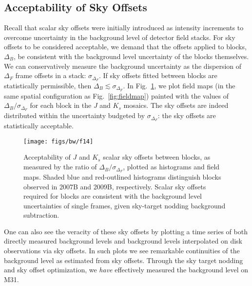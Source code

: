 \documentclass[iop,tighten]{emulateapj}
\newcommand{\Fig}[1]{Fig.~\ref{fig:#1}}  %
\begin{document}
\subsection{Acceptability of Sky Offsets}
\label{sec:offset_acceptability}

Recall that scalar sky offsets were initially introduced as intensity increments to overcome uncertainty in the background level of detector field stacks.
For sky offsets to be considered acceptable, we demand that the offsets applied to blocks, $\Delta_B$, be consistent with the background level uncertainty of the blocks themselves.
We can conservatively measure the background uncertainty as the dispersion of $\Delta_F$ frame offsets in a stack: $\sigma_{\Delta_F}$.
If sky offsets fitted between blocks are statistically permissible, then $\Delta_B \lesssim \sigma_{\Delta_F}$.
In \Fig{offset_ratio_map}, we plot field maps (in the same spatial configuration as \Fig{fieldmap}) painted with the values of $\Delta_B / \sigma_{\Delta_F}$ for each block in the $J$ and $K_s$ mosaics.
The sky offsets are indeed distributed within the uncertainty budgeted by $\sigma_{\Delta_F}$: the sky offsets are statistically acceptable.

\begin{figure}[t]
\centering
\texttt{[image: figs/bw/f14]}
\caption{Acceptability of $J$ and $K_s$ scalar sky offsets between blocks, as measured by the ratio of $\Delta_B/\sigma_{\Delta_F}$, plotted as histograms and field maps. Shaded blue and red-outlined histograms distinguish blocks observed in 2007B and 2009B, respectively. Scalar sky offsets required for blocks are consistent with the background level uncertainties of single frames, given sky-target nodding background subtraction.}
\label{fig:offset_ratio_map}
\end{figure}

One can also see the veracity of these sky offsets by plotting a time series of both directly measured background levels and background levels interpolated on disk observations via sky offsets.
In such plots we see remarkable continuities of the background level as estimated from sky offsets.
Through the sky target nodding and sky offset optimization, we \emph{have} effectively measured the background level on M31.

\end{document}
